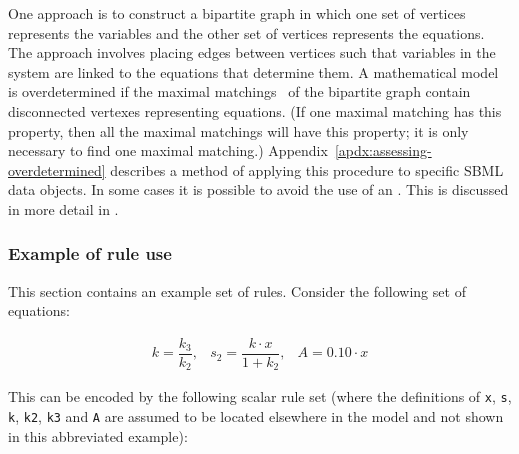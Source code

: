 One approach is to construct a bipartite graph in which one set of
vertices represents the variables and the other set of vertices
represents the equations.  The approach involves placing edges
between vertices such that variables in the system are linked to
the equations that determine them.  A mathematical model is
overdetermined if the maximal matchings~\citep{chartrand_1977} of
the bipartite graph contain disconnected vertexes representing
equations.  (If one maximal matching has this property, then all
the maximal matchings will have this property; \ie it is only
necessary to find one maximal matching.)
Appendix~\ref{apdx:assessing-overdetermined} describes a method of
applying this procedure to specific SBML data objects.  In some
cases it is possible to avoid the use of an \AlgebraicRule.  This
is discussed in more detail in .


\subsubsection{Example of rule use}
\label{sec:eg-rule-use}

This section contains an example set of rules.  Consider the
following set of equations:
\begin{linenomath}
  \begin{equation*}
    \begin{array}{lll}
      k = \dfrac{k_3}{k_2}, & s_2 = \dfrac{k \cdot x}{1 + k_2}, & A = 0.10 \cdot x
    \end{array}
  \end{equation*}
\end{linenomath}
This can be encoded by the following scalar rule set (where the
definitions of \texttt{x}, \texttt{s}, \texttt{k}, \texttt{k2},
\texttt{k3} and \texttt{A} are assumed to be located elsewhere in
the model and not shown in this abbreviated example):

